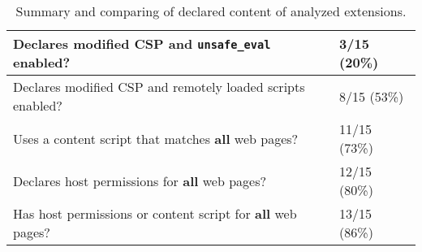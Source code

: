 	\begin{table}[h]
		\centering
		\begin{tabular}{|l|l|} \hline
			Declares modified CSP and \texttt{unsafe\_eval} enabled? & 3/15 (20\%) \\ \hline
			Declares modified CSP and remotely loaded scripts enabled? & 8/15 (53\%) \\ \hline
			Uses a content script that matches \textbf{all} web pages? & 11/15 (73\%) \\ \hline
			Declares host permissions for \textbf{all} web pages? & 12/15 (80\%) \\ \hline
			Has host permissions or content script for \textbf{all} web pages? & 13/15 (86\%) \\ \hline
		\end{tabular}
		\caption{Summary and comparing of declared content of analyzed extensions.}
		\label{tab:analysisSummaryContent}
	\end{table}
